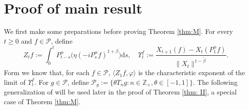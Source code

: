 \documentclass[12pt,a4paper]{amsart}
\theoremstyle{plain}
\theoremstyle{definition}
\numberwithin{equation}{section}
\begin{document}
\section{Proof of main result}
\label{proofs of main results}

We first make some preparations before proving Theorem \ref{thm:M}.
For every $t\geq 0$ and $f\in \mathcal P$, define
\[
  	Z_t f
  	:= \int_0^t P^\alpha_{t-s}\big( \eta (-i P^\alpha_sf)^{1+\beta}\big)\mathrm ds,\quad
  	\Upsilon^f_t
   := \frac{X_{t+1} (f) - X_t(P_1^\alpha f)}{\| X_t\|^{1-\tilde \beta}}.
\]
Form \cite[Theorem 3.4]{RenSongSunZhao2019Stable} we know that, for each $f\in \mathcal P$, $\langle Z_1f,\varphi\rangle$ is the characteristic exponent of the limit of $\Upsilon^f_t$.
For $g\in \mathcal P$, define $\mathcal P_g:= \{\theta T_ng:n \in \mathbb Z_+, \theta \in [-1,1]\}$.
The following generalization of
\cite[Proposition 3.5]{RenSongSunZhao2019Stable} will be used later in the proof of  Theorem \ref{thm: II}, a special case of Theorem \ref{thm:M}.
\end{document}

